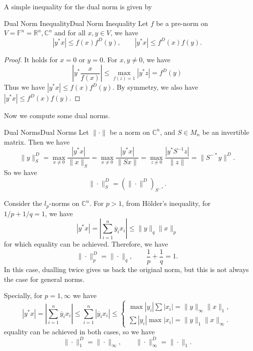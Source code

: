 \documentclass[../main.tex]{subfiles}
\begin{document}
A simple inequality for the dual norm is given by
\begin{lemma}{Dual Norm Inequality}{Dual Norm Inequality}
  Let $f$ be a pre-norm on $V = \mathbb{F}^n = \mathbb{R}^n, \mathbb{C}^n$ and for all $x,y \in V$, we have
  \begin{equation}
    |y^* x| \leq f(x) f^D(y), \qquad |y^* x| \leq f^D(x) f(y).
  \end{equation}
\end{lemma}
\begin{proof}
  It holds for $x = 0$ or $y = 0$. For $x, y \neq 0$, we have
  \begin{equation*}
    |y^* \frac{x}{f(x)}| \leq \max_{f(z) = 1} |y^* z| = f^D(y)
  \end{equation*}
  Thus we have $|y^* x| \leq f(x) f^D(y)$. By symmetry, we also have $|y^* x| \leq f^D(x) f(y)$.
\end{proof}

Now we compute some dual norms.
\begin{example}{Dual Norms}{Dual Norms}
  Let $\| \cdot \|$ be a norm on $\mathbb{C}^n$, and $S \in M_n$ be an invertible matrix. Then we have
  \begin{equation*}
    \|y\|_S^D = \max_{x \neq 0} \frac{|y^* x|}{\|x\|_S} = \max_{x \neq 0} \frac{|y^* x|}{\|S x\|} = \max_{z \neq 0} \frac{|y^* S^{-1} z|}{\|z\|} = \|S^{-*} y\|^D.
  \end{equation*}
  So we have
  \begin{equation}
    \| \cdot \|_S^D = (\| \cdot \|^D)_{S^{-*}}.
  \end{equation}

  Consider the $l_p$-norms on $\mathbb{C}^n$. For $p > 1$, from H\"older's inequality, for $1/p + 1/q = 1$, we have
  \begin{equation*}
    |y^* x| = \left| \sum_{i=1}^n \overline{y}_i x_i \right| \leq \|y\|_q \|x\|_p
  \end{equation*}
  for which equality can be achieved. Therefore, we have
  \begin{equation}
    \|\cdot\|_p^D = \|\cdot\|_q, \qquad \frac{1}{p} + \frac{1}{q} = 1.
  \end{equation}
  In this case, dualling twice gives us back the original norm, but this is not always the case for general norms.

  Specially, for $p=1, \infty $ we have
  \begin{equation*}
    |y^* x| = \left| \sum_{i=1}^n \overline{y}_i x_i \right| \leq \sum_{i=1}^n |\overline{y}_i x_i| \leq 
    \begin{cases}
      \max |y_i| \sum |x_i| = \|y\|_\infty \|x\|_1, \\
      \sum |y_i| \max |x_i| = \|y\|_1 \|x\|_\infty.
    \end{cases}
  \end{equation*}
  equality can be achieved in both cases, so we have
  \begin{equation}
    \|\cdot\|_1^D = \|\cdot\|_\infty, \qquad \|\cdot\|_\infty^D = \|\cdot\|_1.
  \end{equation}
\end{example}
\end{document}
